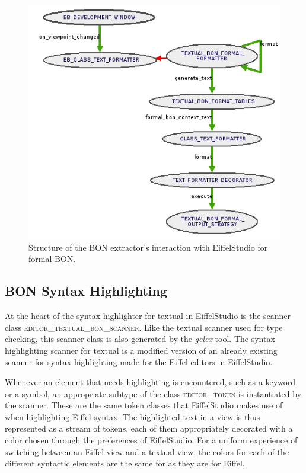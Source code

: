 \begin{figure}[H]
\centerline{
\includegraphics[scale=0.7]{images/BON-extractor-structure-large.png}
}
\caption{Structure of the BON extractor's interaction with EiffelStudio for formal BON.}
\label{fig:extractor_structure}
\end{figure}

\subsection{BON Syntax Highlighting}
At the heart of the syntax highlighter for textual \bon{} in EiffelStudio is the scanner class \textsc{editor\_textual\_bon\_scanner}. Like the textual \bon{} scanner used for type checking, this scanner class is also generated by the \textit{gelex} tool. The syntax highlighting scanner for textual \bon{} is a modified version of an already existing scanner for syntax highlighting made for the Eiffel editors in EiffelStudio. 

Whenever an element that needs highlighting is encountered, such as a keyword or a symbol, an appropriate subtype of the class \textsc{editor\_token} is instantiated by the scanner. These are the same token classes that EiffelStudio makes use of when highlighting Eiffel syntax. The highlighted text in a view is thus represented as a stream of tokens, each of them appropriately decorated with a color chosen through the preferences of EiffelStudio. For a uniform experience of switching between an Eiffel view and a textual \bon{} view, the colors for each of the different syntactic elements are the same for \bon{} as they are for Eiffel.

